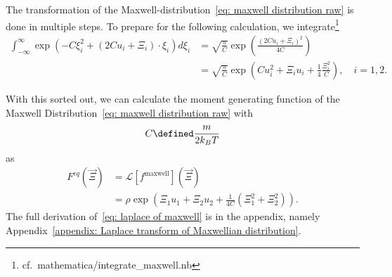 The transformation of the Maxwell-distribution~\eqref{eq: maxwell distribution raw} is done in multiple steps.
To prepare for the following calculation, we integrate\footnote{cf.\ mathematica/integrate\_maxwell.nb}
\begin{equation}
  \label{eq:integrate exponential sage}
  \begin{aligned}
    \int_{-\infty}^{\infty} \exp \left(-C \xi_i^2 + (2Cu_i + \Xi_i)\cdot\xi_i \right) d\xi_i
    & = \sqrt{\frac{\pi}{C}}\exp \left( \frac{{(2Cu_i + \Xi_i)}^2}{4C}\right)
    \\
    & = \sqrt{\frac{\pi}{C}}\exp \left(Cu_i^2 + \Xi_i u_i + \frac{1}{4} \frac{\Xi_i^2}{C}\right),\quad i=1,2
    .
  \end{aligned}
\end{equation}

With this sorted out, we can calculate the moment generating function of the Maxwell Distribution~\eqref{eq: maxwell distribution raw} with
\begin{equation}
  C \defined \frac{m}{2 k_B T}
\end{equation}
as
\begin{equation}
  \label{eq: laplace of maxwell}
  \begin{aligned}
    F^{eq}(\vec{\Xi}) & = \mathcal{L}[f^{\text{maxwell}}](\vec{\Xi})
    \\& = \rho
      \exp \left( \Xi_1 u_1 + \Xi_2 u_2 + \frac{1}{4C}\left(\Xi_1^2 + \Xi_2^2 \right)\right).
  \end{aligned}
\end{equation}
The full derivation of~\eqref{eq: laplace of maxwell} is in the appendix, namely Appendix~\ref{appendix: Laplace transform of Maxwellian distribution}.
